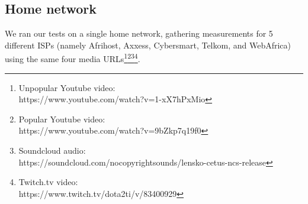 \documentclass{sig-alternate-05-2015}
\begin{document}
\subsection{Home network}


We ran our tests on a single home network, gathering measurements for 5 different ISPs (namely Afrihost, Axxess, Cybersmart, Telkom, and WebAfrica) using the same four media URLs\footnote{Unpopular Youtube video: \\ https://www.youtube.com/watch?v=1-xX7hPxMio}\footnote{Popular Youtube video: \\ https://www.youtube.com/watch?v=9bZkp7q19f0}\footnote{Soundcloud audio: \\ https://soundcloud.com/nocopyrightsounds/lensko-cetus-ncs-release}\footnote{Twitch.tv video: \\https://www.twitch.tv/dota2ti/v/83400929}.
\end{document}

